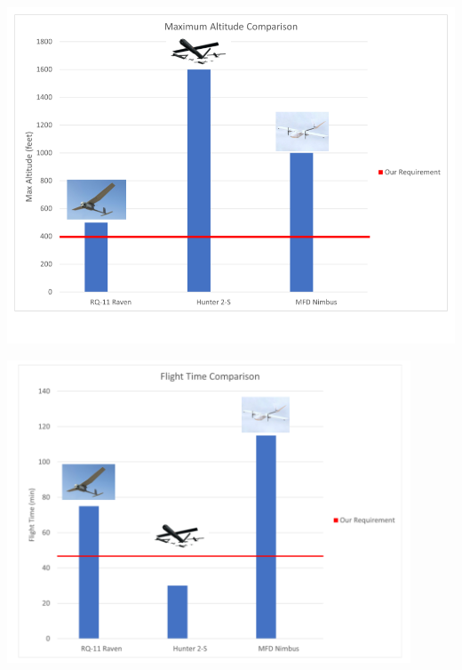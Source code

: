 \documentclass{beamer}
\begin{document}
    \begin{frame}
        \centering
        \includegraphics[width=\textwidth]{figures/market research/AltitudeComparison.png}
    \end{frame}
    \begin{frame}
        \centering
        \includegraphics[width=0.9\textwidth]{figures/market research/FlightTimeComparison.png}
    \end{frame}
\end{document}
